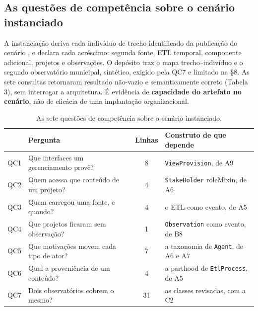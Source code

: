 \subsection{As questões de competência sobre o cenário instanciado}

A instanciação deriva cada indivíduo de trecho identificado da publicação do cenário \cite{sbsi_estendido}, e declara cada acréscimo: segunda fonte, ETL temporal, componente adicional, projetos e observações. O depósito traz o mapa trecho--indivíduo e o segundo observatório municipal, sintético, exigido pela QC7 e limitado na \S{}8. As sete consultas retornaram resultado não-vazio e semanticamente correto (Tabela 3), sem interrogar a arquitetura. É evidência de \textbf{capacidade do artefato no cenário}, não de eficácia de uma implantação organizacional.

\begin{table}[H]
\centering
\caption{As sete questões de competência sobre o cenário instanciado.}
\label{tab:3}
\scriptsize
\setlength{\tabcolsep}{3pt}
\begin{tabularx}{\linewidth}{c>{\raggedright\arraybackslash\hsize=0.9687\hsize}Xc>{\raggedright\arraybackslash\hsize=1.0313\hsize}X}
\hline
 & \textbf{Pergunta} & \textbf{Linhas} & \textbf{Construto de que depende} \\
\hline
QC1 & Que interfaces um gerenciamento provê? & 8 & \texttt{ViewProvision}, de A9 \\
QC2 & Quem acessa que conteúdo de um projeto? & 4 & \texttt{StakeHolder} \guillemotleft{}roleMixin\guillemotright{}, de A6 \\
QC3 & Quem carregou uma fonte, e quando? & 4 & o ETL como evento, de A5 \\
QC4 & Que projetos ficaram sem observação? & 1 & \texttt{Observation} como evento, de B8 \\
QC5 & Que motivações movem cada tipo de ator? & 7 & a taxonomia de \texttt{Agent}, de A6 e A7 \\
QC6 & Qual a proveniência de um conteúdo? & 4 & a parthood de \texttt{EtlProcess}, de A5 \\
QC7 & Dois observatórios cobrem o mesmo? & 31 & as classes revisadas, com a C2 \\
\hline
\end{tabularx}
\end{table}

